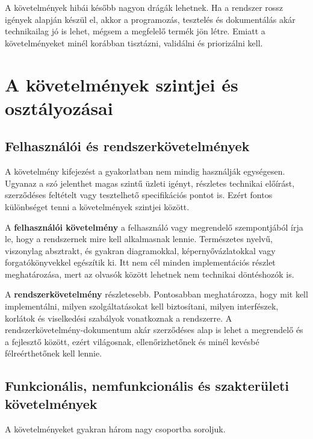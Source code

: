 A követelmények hibái később nagyon drágák lehetnek. Ha a rendszer rossz igények alapján készül el, akkor a programozás, tesztelés és dokumentálás akár technikailag jó is lehet, mégsem a megfelelő termék jön létre. Emiatt a követelményeket minél korábban tisztázni, validálni és priorizálni kell.

\section{A követelmények szintjei és osztályozásai}

\subsection{Felhasználói és rendszerkövetelmények}

A követelmény kifejezést a gyakorlatban nem mindig használják egységesen. Ugyanaz a szó jelenthet magas szintű üzleti igényt, részletes technikai előírást, szerződéses feltételt vagy tesztelhető specifikációs pontot is. Ezért fontos különbséget tenni a követelmények szintjei között.

\begin{center}

\end{center}

A \textbf{felhasználói követelmény} a felhasználó vagy megrendelő szempontjából írja le, hogy a rendszernek mire kell alkalmasnak lennie. Természetes nyelvű, viszonylag absztrakt, és gyakran diagramokkal, képernyővázlatokkal vagy forgatókönyvekkel egészítik ki. Itt nem cél minden implementációs részlet meghatározása, mert az olvasók között lehetnek nem technikai döntéshozók is.

A \textbf{rendszerkövetelmény} részletesebb. Pontosabban meghatározza, hogy mit kell implementálni, milyen szolgáltatásokat kell biztosítani, milyen interfészek, korlátok és viselkedési szabályok vonatkoznak a rendszerre. A rendszerkövetelmény-dokumentum akár szerződéses alap is lehet a megrendelő és a fejlesztő között, ezért világosnak, ellenőrizhetőnek és minél kevésbé félreérthetőnek kell lennie.

\subsection{Funkcionális, nemfunkcionális és szakterületi követelmények}

A követelményeket gyakran három nagy csoportba soroljuk.

